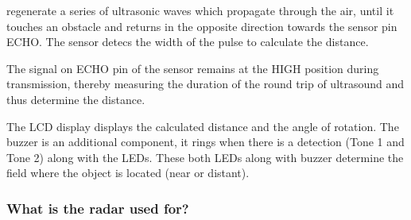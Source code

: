 \documentclass[a4paper]{report}
\begin{document}
                    regenerate  a series of ultrasonic waves which propagate through the air, until it touches 
                    an obstacle and returns in the opposite direction towards the sensor pin ECHO. The sensor 
                    detecs the width of the pulse to calculate the distance. \\
                    \vspace{1mm}
                    \par The signal on ECHO pin of the sensor remains at the HIGH position during transmission, 
                    thereby measuring the duration of the round trip of ultrasound and thus determine the distance. \\
                    \vspace{1mm}
                    \par The LCD display displays the calculated distance and the angle of rotation. The buzzer 
                    is an additional component, it rings when there is a detection (Tone 1 and Tone 2) along 
                    with the LEDs. These both LEDs along with buzzer determine the field where the object is 
                    located (near or distant). \\
                \subsubsection{\large{What is the radar used for?}}
                    
\end{document}
